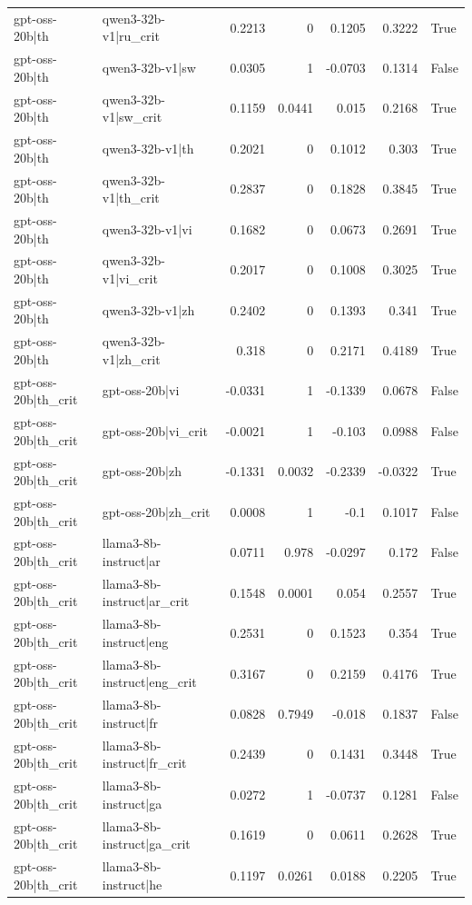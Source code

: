 \begin{table}
\begin{tabular}{l l r r r r l}
gpt-oss-20b|th & qwen3-32b-v1|ru_crit & 0.2213 & 0 & 0.1205 & 0.3222 & True \\
gpt-oss-20b|th & qwen3-32b-v1|sw & 0.0305 & 1 & -0.0703 & 0.1314 & False \\
gpt-oss-20b|th & qwen3-32b-v1|sw_crit & 0.1159 & 0.0441 & 0.015 & 0.2168 & True \\
gpt-oss-20b|th & qwen3-32b-v1|th & 0.2021 & 0 & 0.1012 & 0.303 & True \\
gpt-oss-20b|th & qwen3-32b-v1|th_crit & 0.2837 & 0 & 0.1828 & 0.3845 & True \\
gpt-oss-20b|th & qwen3-32b-v1|vi & 0.1682 & 0 & 0.0673 & 0.2691 & True \\
gpt-oss-20b|th & qwen3-32b-v1|vi_crit & 0.2017 & 0 & 0.1008 & 0.3025 & True \\
gpt-oss-20b|th & qwen3-32b-v1|zh & 0.2402 & 0 & 0.1393 & 0.341 & True \\
gpt-oss-20b|th & qwen3-32b-v1|zh_crit & 0.318 & 0 & 0.2171 & 0.4189 & True \\
gpt-oss-20b|th_crit & gpt-oss-20b|vi & -0.0331 & 1 & -0.1339 & 0.0678 & False \\
gpt-oss-20b|th_crit & gpt-oss-20b|vi_crit & -0.0021 & 1 & -0.103 & 0.0988 & False \\
gpt-oss-20b|th_crit & gpt-oss-20b|zh & -0.1331 & 0.0032 & -0.2339 & -0.0322 & True \\
gpt-oss-20b|th_crit & gpt-oss-20b|zh_crit & 0.0008 & 1 & -0.1 & 0.1017 & False \\
gpt-oss-20b|th_crit & llama3-8b-instruct|ar & 0.0711 & 0.978 & -0.0297 & 0.172 & False \\
gpt-oss-20b|th_crit & llama3-8b-instruct|ar_crit & 0.1548 & 0.0001 & 0.054 & 0.2557 & True \\
gpt-oss-20b|th_crit & llama3-8b-instruct|eng & 0.2531 & 0 & 0.1523 & 0.354 & True \\
gpt-oss-20b|th_crit & llama3-8b-instruct|eng_crit & 0.3167 & 0 & 0.2159 & 0.4176 & True \\
gpt-oss-20b|th_crit & llama3-8b-instruct|fr & 0.0828 & 0.7949 & -0.018 & 0.1837 & False \\
gpt-oss-20b|th_crit & llama3-8b-instruct|fr_crit & 0.2439 & 0 & 0.1431 & 0.3448 & True \\
gpt-oss-20b|th_crit & llama3-8b-instruct|ga & 0.0272 & 1 & -0.0737 & 0.1281 & False \\
gpt-oss-20b|th_crit & llama3-8b-instruct|ga_crit & 0.1619 & 0 & 0.0611 & 0.2628 & True \\
gpt-oss-20b|th_crit & llama3-8b-instruct|he & 0.1197 & 0.0261 & 0.0188 & 0.2205 & True \\

\end{tabular}
\end{table}

